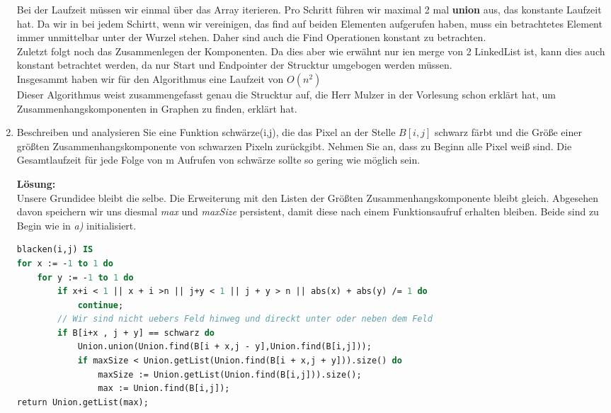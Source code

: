 \documentclass[11pt,a4paper,ngerman]{article}
\begin{document}
\begin{enumerate}[\bfseries (a)]
Bei der Laufzeit müssen wir einmal über das Array iterieren. Pro Schritt führen wir maximal 2 mal \textbf{union} aus, das konstante Laufzeit hat.  Da wir in bei jedem Schirtt, wenn wir vereinigen, das find auf beiden Elementen aufgerufen haben, muss ein betrachtetes Element immer unmittelbar unter der Wurzel stehen. Daher sind auch die Find Operationen konstant zu betrachten.\\
Zuletzt folgt noch das Zusammenlegen der Komponenten. Da dies aber wie erwähnt nur ien merge von 2 LinkedList ist, kann dies auch konstant betrachtet werden, da nur Start und Endpointer der Strucktur umgebogen werden müssen.\\
Insgesammt haben wir für den Algorithmus eine Laufzeit von $O(n^2)$\\

Dieser Algorithmus weist zusammengefasst genau die Strucktur auf, die Herr Mulzer in der Vorlesung schon erklärt hat, um Zusammenhangskomponenten in Graphen zu finden, erklärt hat.


\item Beschreiben und analysieren Sie eine Funktion schwärze(i,j), die das Pixel an der Stelle $B[i,j]$ schwarz färbt und die Größe einer größten Zusammenhangskomponente von schwarzen Pixeln zurückgibt. Nehmen Sie an, dass zu Beginn alle Pixel weiß sind. Die Gesamtlaufzeit für jede Folge von m Aufrufen von schwärze sollte so gering wie möglich sein.

\textbf{Lösung:}\\
Unsere Grundidee bleibt die selbe. Die Erweiterung mit den Listen der Größten Zusammenhangskomponente bleibt gleich. Abgesehen davon speichern wir uns diesmal \emph{max} und \emph{maxSize} persistent, damit diese nach einem Funktionsaufruf erhalten bleiben.
Beide sind zu Begin wie in \emph{a)} initialisiert.\\

\begin{lstlisting}[language=Pascal]
blacken(i,j) IS
for x := -1 to 1 do
	for y := -1 to 1 do
		if x+i < 1 || x + i >n || j+y < 1 || j + y > n || abs(x) + abs(y) /= 1 do
			continue;
		// Wir sind nicht uebers Feld hinweg und direckt unter oder neben dem Feld
		if B[i+x , j + y] == schwarz do
			Union.union(Union.find(B[i + x,j - y],Union.find(B[i,j]));
			if maxSize < Union.getList(Union.find(B[i + x,j + y])).size() do				
				maxSize := Union.getList(Union.find(B[i,j])).size();
				max := Union.find(B[i,j]);
return Union.getList(max);
\end{lstlisting}


\end{enumerate}
\end{document}
